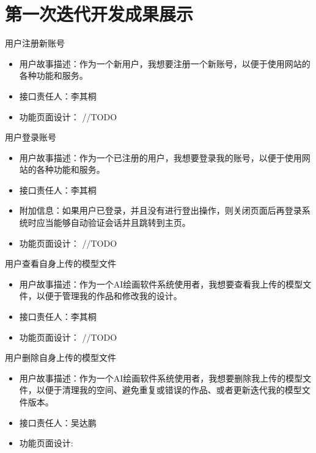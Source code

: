 \section{第一次迭代开发成果展示}
\begin{frame}{用户注册新账号}
    \begin{itemize}
        \item 用户故事描述：作为一个新用户，我想要注册一个新账号，以便于使用网站的各种功能和服务。
        \item 接口责任人：李其桐
        \item 功能页面设计： //TODO
    \end{itemize}
\end{frame}

\begin{frame}{用户登录账号}
    \begin{itemize}
        \item 用户故事描述：作为一个已注册的用户，我想要登录我的账号，以便于使用网站的各种功能和服务。
        \item 接口责任人：李其桐
        \item 附加信息：如果用户已登录，并且没有进行登出操作，则关闭页面后再登录系统时应当能够自动验证会话并且跳转到主页。
        \item 功能页面设计： //TODO
    \end{itemize}
\end{frame}

\begin{frame}{用户查看自身上传的模型文件}
    \begin{itemize}
        \item 用户故事描述：作为一个AI绘画软件系统使用者，我想要查看我上传的模型文件，以便于管理我的作品和修改我的设计。
        \item 接口责任人：李其桐
        \item 功能页面设计： //TODO
    \end{itemize}
\end{frame}

\begin{frame}{用户删除自身上传的模型文件}
    \begin{itemize}
        \item 用户故事描述：作为一个AI绘画软件系统使用者，我想要删除我上传的模型文件，以便于清理我的空间、避免重复或错误的作品、或者更新迭代我的模型文件版本。
        \item 接口责任人：吴达鹏
        \item 功能页面设计:
    \end{itemize}
\end{frame}

